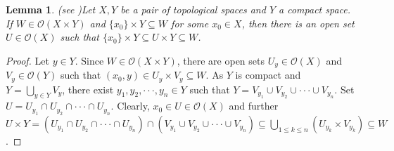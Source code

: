 \documentclass[preprint,12pt]{elsarticle}
\numberwithin{equation}{section}
\newtheorem{lemma}[theorem]{Lemma}
\begin{document}
\begin{lemma}{\rm (see \cite{RE77})Let $X,Y$ be a pair of topological spaces and $Y$ a compact space. If $W\in\mathcal{O}(X\times Y)$ and $\{x_{0}\}\times Y\subseteq W$ for some $x_{0}\in X$, then there is an open set $U\in\mathcal{O}(X)$ such that $\{x_{0}\}\times Y\subseteq U\times Y\subseteq W$.}
\end{lemma}

\begin{proof} Let $y\in Y$. Since $W\in\mathcal{O}(X\times Y)$, there are open sets $U_{y}\in\mathcal{O}(X)$ and $V_{y}\in\mathcal{O}(Y)$ such that $(x_{0},y)\in U_{y}\times V_{y}\subseteq W$. As $Y$ is compact and $Y=\bigcup_{y\in Y}V_{y}$, there exist $y_{1},y_{2},\cdot\cdot\cdot,y_{n}\in Y$ such that $Y=V_{y_{1}}\cup V_{y_{2}}\cup\cdot\cdot\cdot\cup V_{y_{n}}$. Set $U=U_{y_{1}}\cap U_{y_{2}}\cap\cdot\cdot\cdot\cap U_{y_{n}}$. Clearly, $x_{0}\in U\in\mathcal{O}(X)$ and further
$U\times Y=(U_{y_{1}}\cap U_{y_{2}}\cap\cdot\cdot\cdot\cap U_{y_{n}})\cap(V_{y_{1}}\cup V_{y_{2}}\cup\cdot\cdot\cdot\cup V_{y_{n}})\subseteq \bigcup\limits_{1\leq k\leq n}(U_{y_{k}}\times V_{y_{k}})\subseteq W$.
\end{proof}
\end{document}
